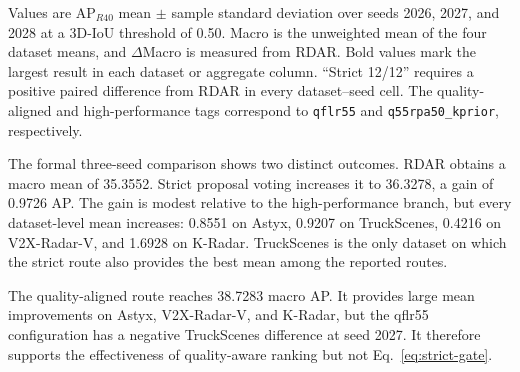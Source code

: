 \documentclass[final,5p,times]{elsarticle}
\newcommand{\reviewcaption}[1]{\caption{\textcolor{floatreviewblue}{#1}}}
\newcommand{\reviewcaption}[1]{\caption{#1}}
\begin{document}
\begin{table}[!t]
\centering
\reviewcaption{Main three-seed comparison of RDAR and the quality-aligned,
high-performance, and strict routes.}
\label{tab:main-results}
\begingroup
\color{black}
\scriptsize
\setlength{\tabcolsep}{5pt}
\renewcommand{\arraystretch}{1.20}
\endgroup
\vspace{2pt}
\parbox{\textwidth}{\scriptsize
Values are AP$_{R40}$ mean $\pm$ sample standard deviation over seeds 2026,
2027, and 2028 at a 3D-IoU threshold of 0.50. Macro is the unweighted mean of
the four dataset means, and $\Delta$Macro is measured from RDAR. Bold values
mark the largest result in each dataset or aggregate column. ``Strict 12/12''
requires a positive paired difference from RDAR in every dataset--seed cell.
The quality-aligned and high-performance tags correspond to
\texttt{qflr55} and \texttt{q55rpa50\_kprior}, respectively.}
\end{table}

The formal three-seed comparison shows two distinct outcomes. RDAR obtains a macro mean of
35.3552. Strict proposal voting increases it to 36.3278, a gain of 0.9726 AP.
The gain is modest relative to the high-performance branch, but every
dataset-level mean increases: 0.8551 on Astyx, 0.9207 on TruckScenes, 0.4216
on V2X-Radar-V, and 1.6928 on K-Radar. TruckScenes is the only dataset on
which the strict route also provides the best mean among the reported routes.

The quality-aligned route reaches 38.7283 macro AP. It provides large mean
improvements on Astyx, V2X-Radar-V, and K-Radar, but the qflr55 configuration
has a negative TruckScenes difference at seed 2027. It therefore supports the
effectiveness of quality-aware ranking but not Eq.~\eqref{eq:strict-gate}.
\end{document}
